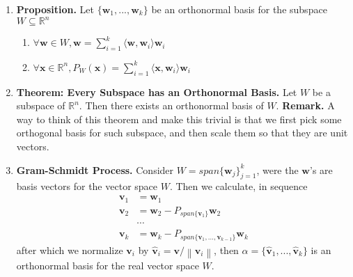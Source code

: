 \documentclass[oneside, 12pt]{book}
\newcommand{\settag}[1]{\renewcommand{\theenumi}{#1}}
\newcommand{\R}{\mathbb{R}}
\newcommand{\tbf}[1]{\textbf{#1}}
\newcommand{\norm}[1]{\left\lVert#1\right\rVert}
\newcommand{\para}[1]{\item \tbf{#1}}
\newcommand{\vv}{\mathbf{v}}
\newcommand{\vw}{\mathbf{w}}
\newcommand{\vx}{\mathbf{x}}
\begin{document}
\begin{enumerate}
    \settag{4.4.6}
    \para{Proposition.} Let $\{\vw_1,...,\vw_k\}$ be an orthonormal basis for the subspace $W \subseteq \R^n$
    \begin{enumerate}
        \item $\forall \vw \in W, \vw = \sum_{i = 1}^k \langle \vw,\vw_i \rangle \vw_i$
        \item $\forall \vx \in \R^n, P_W(\vx) = \sum_{i = 1}^k \langle \vx,\vw_i \rangle \vw_i$
    \end{enumerate}
    
    \settag{4.4.9}
    \para{Theorem: Every Subspace has an Orthonormal Basis.} Let $W$ be a subspace of $\R^n$. 
    Then there exists an orthonormal basis of $W$. \newline 
    \textbf{Remark.} A way to think of this theorem and make this trivial is that we first 
    pick some orthogonal basis for such subspace, and then scale them so that they are unit vectors.
    
    \settag{4.4.9*}
    \para{Gram-Schmidt Process.} Consider $W = span\{\vw_j\}_{j=1}^k$, were the $\vw$'s are 
    basis vectors for the vector space $W$. Then we calculate, in sequence
    \begin{align*}
        \vv_1 &= \vw_1 \\
        \vv_2 &= \vw_2 - P_{span\{\vv_1\}}\vw_2 \\
              &\cdots  \\
        \vv_k &= \vw_k - P_{span\{\vv_1,...,\vv_{k-1}\}}\vw_k
    \end{align*}
    after which we normalize $\vv_i$ by $\hat{\vv}_i = \vv / \norm{\vv_i}$, then $\alpha = 
    \{\hat{\vv}_1,...,\hat{\vv}_k\}$ is an orthonormal basis for the real vector space $W$.
\end{enumerate}
\end{document}
